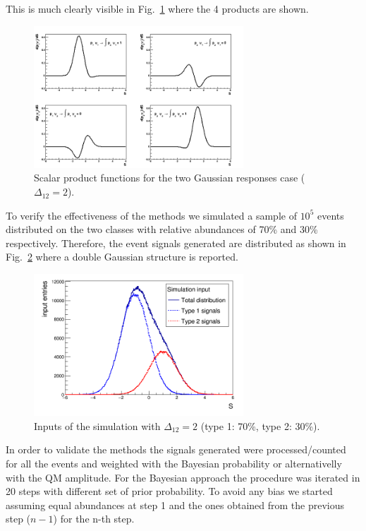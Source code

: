 This is much clearly visible in Fig.~\ref{fig:SPGaus2} where the 4 products
are shown.

\begin{figure}[!htb]
\centering
\includegraphics[width=0.7\textwidth]{../png/figSPgaus.png}
\caption{Scalar product functions for the two Gaussian responses case ($\Delta_{12} = 2$).}
\label{fig:SPGaus2}
\end{figure}

To verify the effectiveness of the methods we simulated a sample of $10^5$
events distributed on the two classes with relative abundances of 70\% and
30\% respectively.
Therefore, the event signals generated are distributed as shown in
Fig.~\ref{fig:InputGaus2} where a double Gaussian structure is reported.

\begin{figure}[!htb]
\centering
\includegraphics[width=0.7\textwidth]{../png/figInput.png}
\caption{Inputs of the simulation with $\Delta_{12} = 2$ (type 1: 70\%, type 2: 30\%).}
\label{fig:InputGaus2}
\end{figure}

In order to validate the methods the signals generated were processed/counted
for all the events and weighted with the Bayesian probability or
alternativelly with the QM amplitude.
For the Bayesian approach the procedure was iterated in 20 steps with
different set of prior probability. To avoid any bias we started assuming
equal abundances at step 1 and the ones obtained from the previous step
($n-1$) for the n-th step.

